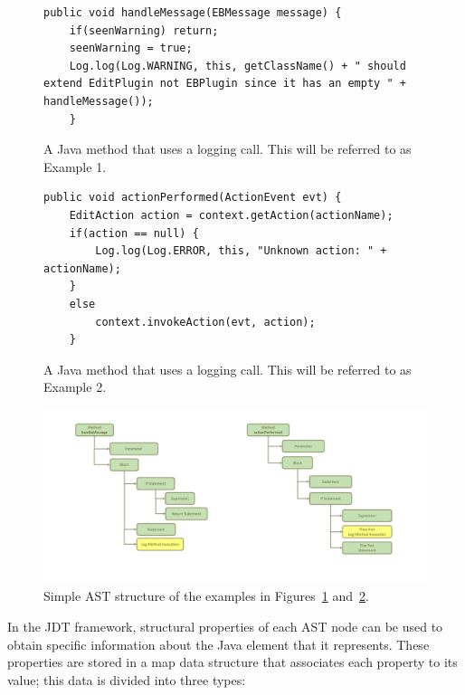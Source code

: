 \begin{figure}[p]
\def\baselinestretch{1}
\begin{lstlisting}
public void handleMessage(EBMessage message) {
	if(seenWarning) return;
	seenWarning = true;
	Log.log(Log.WARNING, this, getClassName() + " should extend EditPlugin not EBPlugin since it has an empty " + handleMessage());
    }
\end{lstlisting}
\caption[Example 1: A Java method that uses a logging call.]{A Java method that uses a logging call. This will be referred to as Example 1.\label{ch3-ex1}}
\end{figure}

\begin{figure}[p]
\def\baselinestretch{1}
\begin{lstlisting}
public void actionPerformed(ActionEvent evt) {
	EditAction action = context.getAction(actionName);
	if(action == null) {
		Log.log(Log.ERROR, this, "Unknown action: " + actionName);
	}
	else
		context.invokeAction(evt, action);
	}
\end{lstlisting}
\caption[Example 2: A Java method that uses a logging call.]{A Java method that uses a logging call. This will be referred to as Example 2.\label{ch3-ex2}}
\end{figure}

\begin{figure} [p]
  \centering\includegraphics[width = \textwidth]{Drawing4/AST.pdf}
  \caption{Simple AST structure of the examples in Figures~\ref{ch3-ex1} and~\ref{ch3-ex2}.}
  \label{fig:ast}
\end{figure}

In the JDT framework, structural properties of each AST node can be used to obtain specific information about the Java element that it represents. These properties are stored in a map data structure that associates each property to its value; this data is divided into three types:

